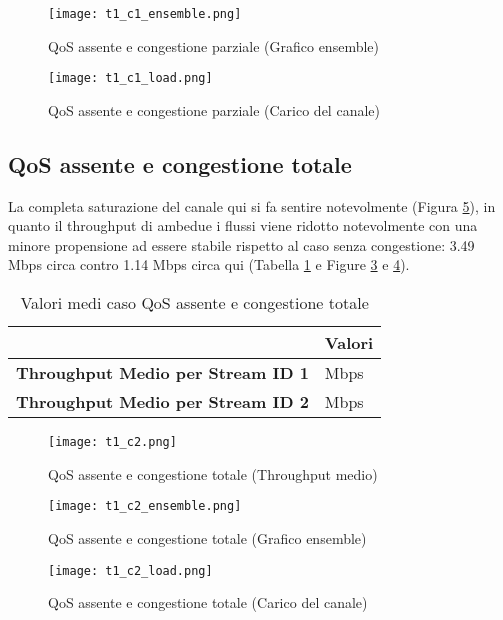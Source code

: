 \begin{figure}[h!]
    \centering
    \texttt{[image: t1\_c1\_ensemble.png]}
    \caption{QoS assente e congestione parziale (Grafico ensemble)}
    \label{fig:t1_c1_ensemble}
\end{figure}
\clearpage
\begin{figure}[h!]
    \centering
    \texttt{[image: t1\_c1\_load.png]}
    \caption{QoS assente e congestione parziale (Carico del canale)}
    \label{fig:t1_c1_load}
\end{figure}

\subsection[QoS assente e congestione totale]{QoS assente e congestione totale}
La completa saturazione del canale qui si fa sentire notevolmente (Figura \ref{fig:t1_c2_load}), in quanto il throughput di ambedue i flussi viene ridotto notevolmente con una minore propensione ad essere stabile rispetto al caso senza congestione: 3.49 Mbps circa contro 1.14 Mbps circa qui (Tabella \ref{table:8} e Figure \ref{fig:t1_c2} e \ref{fig:t1_c2_ensemble}).
\begin{table}[h!]
    \centering
    \begin{tabular}{|>{\centering\arraybackslash}p{20em}|>{\centering\arraybackslash}p{7em}|} 
     \hline
     \textbf{} & \textbf{Valori} \\ 
     \hline
     \textbf{Throughput Medio per Stream ID 1} & 1.14 Mbps \\ 
     \hline
     \textbf{Throughput Medio per Stream ID 2} & 1.19 Mbps \\
     \hline
    \end{tabular}
    \caption{Valori medi caso QoS assente e congestione totale}
    \label{table:8}
\end{table}

\begin{figure}[h!]
    \centering
    \texttt{[image: t1\_c2.png]}
    \caption{QoS assente e congestione totale (Throughput medio)}
    \label{fig:t1_c2}
\end{figure}

\begin{figure}[h!]
    \centering
    \texttt{[image: t1\_c2\_ensemble.png]}
    \caption{QoS assente e congestione totale (Grafico ensemble)}
    \label{fig:t1_c2_ensemble}
\end{figure}
\clearpage
\begin{figure}[h!]
    \centering
    \texttt{[image: t1\_c2\_load.png]}
    \caption{QoS assente e congestione totale (Carico del canale)}
    \label{fig:t1_c2_load}
\end{figure}

